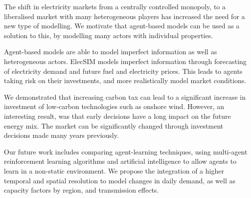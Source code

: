 
The shift in electricity markets from a centrally controlled monopoly, to a liberalised market with many heterogeneous players has increased the need for a new type of modelling. We motivate that agent-based models can be used as a solution to this, by modelling many actors with individual properties. 

Agent-based models are able to model imperfect information as well as heterogeneous actors. ElecSIM models imperfect information through forecasting of electricity demand and future fuel and electricity prices. This leads to agents taking risk on their investments, and more realistically model market conditions.

We demonstrated that increasing carbon tax can lead to a significant increase in investment of low-carbon technologies such as onshore wind. However, an interesting result, was that early decisions have a long impact on the future energy mix. The market can be significantly changed through investment decisions made many years previously. 

Our future work includes comparing agent-learning techniques, using multi-agent reinforcement learning algorithms and artificial intelligence to allow agents to learn in a non-static environment. We propose the integration of a higher temporal and spatial resolution to model changes in daily demand, as well as capacity factors by region, and transmission effects.


\FloatBarrier